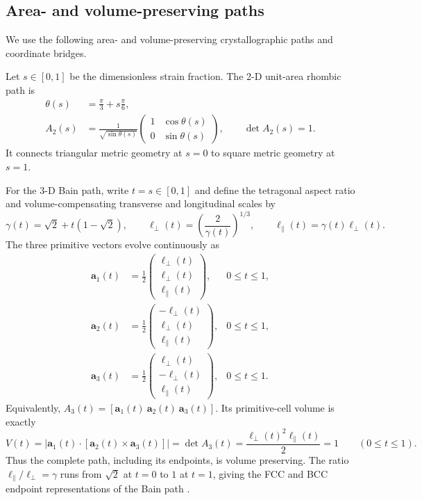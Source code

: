 \documentclass[11pt]{article}
\begin{document}
\subsection{Area- and volume-preserving paths}

We use the following area- and volume-preserving crystallographic paths and coordinate
bridges.

Let $s\in[0,1]$ be the dimensionless strain fraction. The 2-D unit-area rhombic path is
\begin{align}
 \theta(s)&=\frac\pi3+s\frac\pi6,\\
 A_2(s)&=\frac{1}{\sqrt{\sin\theta(s)}}
 \begin{pmatrix}
 1&\cos\theta(s)\\
 0&\sin\theta(s)
 \end{pmatrix},
 \qquad \det A_2(s)=1.
 \label{eq:strain-rhombic-path}
\end{align}
It connects triangular metric geometry at $s=0$ to square metric geometry at $s=1$.

For the 3-D Bain path, write $t=s\in[0,1]$ and define the tetragonal aspect ratio
and volume-compensating transverse and longitudinal scales by
\begin{equation}
 \gamma(t)=\sqrt2+t(1-\sqrt2),
 \qquad
 \ell_\perp(t)=\left(\frac{2}{\gamma(t)}\right)^{1/3},
 \qquad
 \ell_\parallel(t)=\gamma(t)\ell_\perp(t).
 \label{eq:strain-bain-scales}
\end{equation}
The three primitive vectors evolve continuously as
\begin{align}
 \mathbf a_1(t)&=\frac12
 \begin{pmatrix}\ell_\perp(t)\\\ell_\perp(t)\\\ell_\parallel(t)\end{pmatrix},
 &0\le t\le1,\\
 \mathbf a_2(t)&=\frac12
 \begin{pmatrix}-\ell_\perp(t)\\\ell_\perp(t)\\\ell_\parallel(t)\end{pmatrix},
 &0\le t\le1,\\
 \mathbf a_3(t)&=\frac12
 \begin{pmatrix}\ell_\perp(t)\\-\ell_\perp(t)\\\ell_\parallel(t)\end{pmatrix},
 &0\le t\le1.
 \label{eq:strain-bain-vectors}
\end{align}
Equivalently,
$A_3(t)=[\mathbf a_1(t)\ \mathbf a_2(t)\ \mathbf a_3(t)]$. Its primitive-cell volume
is exactly
\begin{equation}
 V(t)=\left|\mathbf a_1(t)\cdot
 [\mathbf a_2(t)\times\mathbf a_3(t)]\right|
 =\det A_3(t)
 =\frac{\ell_\perp(t)^2\ell_\parallel(t)}{2}=1
 \qquad (0\le t\le1).
 \label{eq:strain-bain-volume-invariant}
\end{equation}
Thus the complete path, including its endpoints, is volume preserving. The ratio
$\ell_\parallel/\ell_\perp=\gamma$ runs from $\sqrt2$ at $t=0$ to $1$ at $t=1$,
giving the FCC and BCC endpoint representations of the Bain path
\cite{Bain1924Martensite}.
\end{document}

